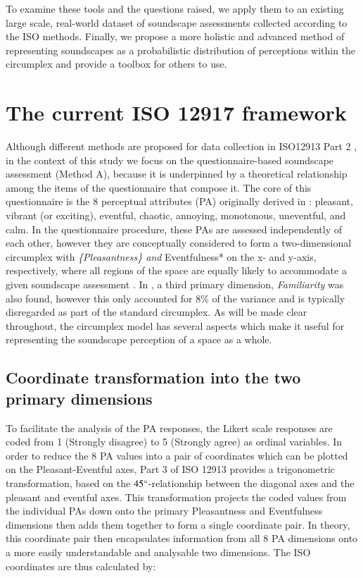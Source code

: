 \documentclass[
  authoryear,
  preprint,
  3p]{elsarticle}
\begin{document}
To examine these tools and the questions raised, we apply them to an
existing large scale, real-world dataset of soundscape assessments
collected according to the ISO methods. Finally, we propose a more
holistic and advanced method of representing soundscapes as a
probabilistic distribution of perceptions within the circumplex and
provide a toolbox for others to use.

\hypertarget{sec-current}{%
\section{The current ISO 12917 framework}\label{sec-current}}

Although different methods are proposed for data collection in ISO12913
Part 2 \citep{ISO12913_2}, in the context of this study we focus on the
questionnaire-based soundscape assessment (Method A), because it is
underpinned by a theoretical relationship among the items of the
questionnaire that compose it. The core of this questionnaire is the 8
perceptual attributes (PA) originally derived in
\citet{Axelsson2010Principal}: pleasant, vibrant (or exciting),
eventful, chaotic, annoying, monotonous, uneventful, and calm. In the
questionnaire procedure, these PAs are assessed independently of each
other, however they are conceptually considered to form a
two-dimensional circumplex with \emph{\{Pleasantness\} and
}Eventfulness* on the x- and y-axis, respectively, where all regions of
the space are equally likely to accommodate a given soundscape
assessment \citep{Aletta2016Soundscape}. In
\citet{Axelsson2010Principal}, a third primary dimension,
\emph{Familiarity} was also found, however this only accounted for 8\%
of the variance and is typically disregarded as part of the standard
circumplex. As will be made clear throughout, the circumplex model has
several aspects which make it useful for representing the soundscape
perception of a space as a whole.

\hypertarget{coordinate-transformation-into-the-two-primary-dimensions}{%
\subsection{Coordinate transformation into the two primary
dimensions}\label{coordinate-transformation-into-the-two-primary-dimensions}}

To facilitate the analysis of the PA responses, the Likert scale
responses are coded from 1 (Strongly disagree) to 5 (Strongly agree) as
ordinal variables. In order to reduce the 8 PA values into a pair of
coordinates which can be plotted on the Pleasant-Eventful axes, Part 3
of ISO 12913 \citep{ISO12913_3} provides a trigonometric transformation,
based on the \(45\degree\)-relationship between the diagonal axes and
the pleasant and eventful axes. This transformation projects the coded
values from the individual PAs down onto the primary Pleasantness and
Eventfulness dimensions then adds them together to form a single
coordinate pair. In theory, this coordinate pair then encapsulates
information from all 8 PA dimensions onto a more easily understandable
and analysable two dimensions. The ISO coordinates are thus calculated
by:
\end{document}
